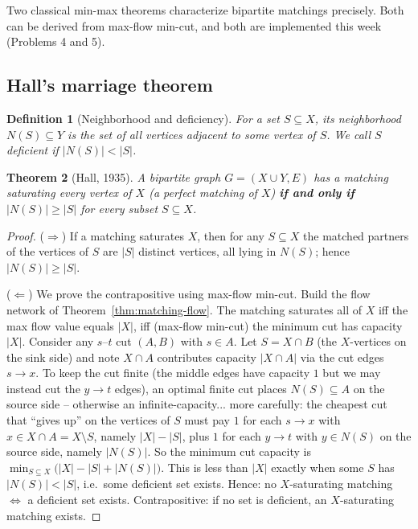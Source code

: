 \documentclass[11pt]{article}
\newtheorem{theorem}{Theorem}[section]
\newtheorem{definition}[theorem]{Definition}
\begin{document}
Two classical min-max theorems characterize bipartite matchings precisely. Both
can be derived from max-flow min-cut, and both are implemented this week
(Problems 4 and 5).

\subsection{Hall's marriage theorem}

\begin{definition}[Neighborhood and deficiency]
For a set $S \subseteq X$, its \emph{neighborhood} $N(S) \subseteq Y$ is the set
of all vertices adjacent to some vertex of $S$. We call $S$ \emph{deficient} if
$|N(S)| < |S|$.
\end{definition}

\begin{theorem}[Hall, 1935]
\label{thm:hall}
A bipartite graph $G=(X \cup Y, E)$ has a matching saturating every vertex of
$X$ (a \emph{perfect matching of $X$}) \textbf{if and only if} $|N(S)| \ge |S|$
for every subset $S \subseteq X$.
\end{theorem}

\begin{proof}
($\Rightarrow$) If a matching saturates $X$, then for any $S \subseteq X$ the
matched partners of the vertices of $S$ are $|S|$ distinct vertices, all lying in
$N(S)$; hence $|N(S)| \ge |S|$.

($\Leftarrow$) We prove the contrapositive using max-flow min-cut. Build the flow
network of Theorem~\ref{thm:matching-flow}. The matching saturates all of $X$
iff the max flow value equals $|X|$, iff (max-flow min-cut) the minimum cut has
capacity $|X|$. Consider any $s$--$t$ cut $(A,B)$ with $s \in A$. Let
$S = X \cap B$ (the $X$-vertices on the sink side) and note $X \cap A$
contributes capacity $|X \cap A|$ via the cut edges $s \to x$. To keep the cut
finite (the middle edges have capacity $1$ but we may instead cut the
$y \to t$ edges), an optimal finite cut places $N(S) \subseteq A$ on the source
side -- otherwise an infinite-capacity... more carefully: the cheapest cut that
``gives up'' on the vertices of $S$ must pay $1$ for each $s\to x$ with
$x \in X\cap A = X \setminus S$, namely $|X|-|S|$, plus $1$ for each $y \to t$
with $y \in N(S)$ on the source side, namely $|N(S)|$. So the minimum cut
capacity is $\min_{S \subseteq X}\big(|X| - |S| + |N(S)|\big)$. This is less than
$|X|$ exactly when some $S$ has $|N(S)| < |S|$, i.e.\ some deficient set exists.
Hence: no $X$-saturating matching $\iff$ a deficient set exists. Contrapositive:
if no set is deficient, an $X$-saturating matching exists.
\end{proof}
\end{document}
